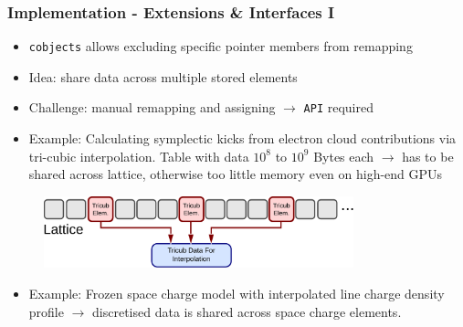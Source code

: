 \documentclass{beamer}
\begin{document}
\begin{frame}
    \frametitle{Implementation - Extensions \& Interfaces I}
    \begin{itemize}
        \item \texttt{cobjects} allows excluding specific pointer members from remapping
        \item {\color{MyDarkBlue} Idea:} share data across multiple stored elements
        \item Challenge: manual remapping and assigning $\rightarrow$ \texttt{API} required
        \item {\color{MyDarkRed} Example:} Calculating symplectic kicks from electron cloud contributions via tri-cubic interpolation\cite{paraschou-iadarola-ecloud-2020}.
        Table with data $10^8$ to $10^9$ Bytes each $\rightarrow$
        has to be shared across lattice, otherwise too little memory even on high-end GPUs
    \end{itemize}
    \begin{figure}[H]
        \centering
        \includegraphics[width=0.8\textwidth]{poster_images/fig_be_external_data}
    \end{figure}
    \begin{itemize}
        \item {\color{MyDarkRed} Example:} Frozen space charge model with interpolated line charge density profile $\rightarrow$ discretised data is shared across space charge elements.
    \end{itemize}
\end{frame}
\end{document}
